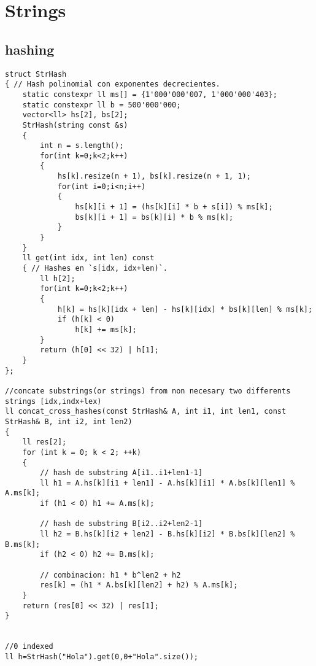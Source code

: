\section*{Strings}

\subsection*{hashing}
\begin{lstlisting}
struct StrHash
{ // Hash polinomial con exponentes decrecientes.
    static constexpr ll ms[] = {1'000'000'007, 1'000'000'403};
    static constexpr ll b = 500'000'000;
    vector<ll> hs[2], bs[2];
    StrHash(string const &s)
    {
        int n = s.length();
        for(int k=0;k<2;k++)
        {
            hs[k].resize(n + 1), bs[k].resize(n + 1, 1);
            for(int i=0;i<n;i++)
            {
                hs[k][i + 1] = (hs[k][i] * b + s[i]) % ms[k];
                bs[k][i + 1] = bs[k][i] * b % ms[k];
            }
        }
    }
    ll get(int idx, int len) const
    { // Hashes en `s[idx, idx+len)`.
        ll h[2];
        for(int k=0;k<2;k++)
        {
            h[k] = hs[k][idx + len] - hs[k][idx] * bs[k][len] % ms[k];
            if (h[k] < 0)
                h[k] += ms[k];
        }
        return (h[0] << 32) | h[1];
    }
};

//concate substrings(or strings) from non necesary two differents strings [idx,indx+lex)
ll concat_cross_hashes(const StrHash& A, int i1, int len1, const StrHash& B, int i2, int len2)
{
    ll res[2];
    for (int k = 0; k < 2; ++k)
    {
        // hash de substring A[i1..i1+len1-1]
        ll h1 = A.hs[k][i1 + len1] - A.hs[k][i1] * A.bs[k][len1] % A.ms[k];
        if (h1 < 0) h1 += A.ms[k];

        // hash de substring B[i2..i2+len2-1]
        ll h2 = B.hs[k][i2 + len2] - B.hs[k][i2] * B.bs[k][len2] % B.ms[k];
        if (h2 < 0) h2 += B.ms[k];

        // combinacion: h1 * b^len2 + h2
        res[k] = (h1 * A.bs[k][len2] + h2) % A.ms[k];
    }
    return (res[0] << 32) | res[1];
}


//0 indexed
ll h=StrHash("Hola").get(0,0+"Hola".size());
\end{lstlisting}

